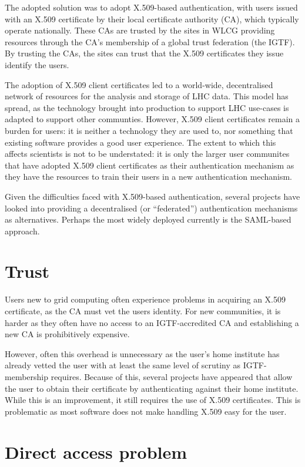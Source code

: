 \documentclass[a4paper]{jpconf}
\begin{document}
The adopted solution was to adopt X.509-based authentication, with
users issued with an X.509 certificate by their local certificate
authority (CA), which typically operate nationally.  These CAs are
trusted by the sites in WLCG providing resources through the CA's
membership of a global trust federation (the IGTF).  By trusting the
CAs, the sites can trust that the X.509 certificates they issue
identify the users.

The adoption of X.509 client certificates led to a world-wide,
decentralised network of resources for the analysis and storage of LHC
data.  This model has spread, as the technology brought into
production to support LHC use-cases is adapted to support other
communties.  However, X.509 client certificates remain a burden for
users: it is neither a technology they are used to, nor something that
existing software provides a good user experience.  The extent to
which this affects scientists is not to be understated: it is only the
larger user communites that have adopted X.509 client certificates as
their authentication mechanism as they have the resources to train
their users in a new authentication mechanism.

Given the difficulties faced with X.509-based authentication, several
projects have looked into providing a decentralised (or ``federated'')
authentication mechanisms as alternatives.  Perhaps the most widely
deployed currently is the SAML-based approach.

\section{Trust}

Users new to grid computing often experience problems in acquiring an
X.509 certificate, as the CA must vet the users identity.  For new
communities, it is harder as they often have no access to an
IGTF-accredited CA and establishing a new CA is prohibitively
expensive.

However, often this overhead is unnecessary as the user's home
institute has already vetted the user with at least the same level of
scrutiny as IGTF-membership requires.  Because of this, several
projects have appeared that allow the user to obtain their certificate
by authenticating against their home
institute\cite{fed-login-teragrid}.  While this is an improvement, it
still requires the use of X.509 certificates.  This is problematic as
most software does not make handling X.509 easy for the user.


\section{Direct access problem}
\end{document}
